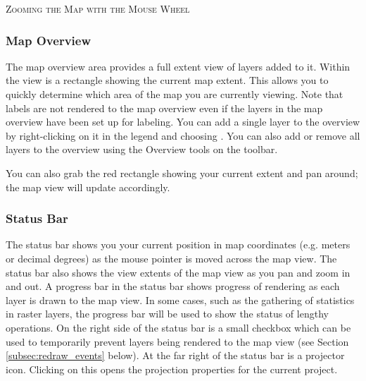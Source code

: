 \begin{Tip}\caption{\textsc{Zooming the Map with the Mouse
Wheel}}
\end{Tip}

\subsubsection{Map Overview}\label{label_mapoverview}

The map overview area provides a full extent view of layers added to it.
Within the view is a rectangle showing the current map extent. This allows
you to quickly determine which area of the map you are currently viewing. Note
that labels are not rendered to the map overview even if the layers in the
map overview have been set up for labeling. 
You can add a single layer to the
overview by right-clicking on it in the legend and choosing . You can also add or remove all layers to the overview using the
Overview tools on the toolbar.

You can also grab the red rectangle showing your current extent and pan around; the
map view will update accordingly.

\subsubsection{Status Bar}\label{label_statusbar}

The status bar shows you your current position in map coordinates (e.g.
meters or decimal degrees) as the mouse pointer is moved across the map view.
The status bar also shows the view extents of the map view as you pan and
zoom in and out. A progress bar in the status bar shows progress of rendering
as each layer is drawn to the map view. In some cases, such as the gathering
of statistics in raster layers, the progress bar will be used to show the
status of lengthy operations. On the right side of the status bar is a small
checkbox which can be used to temporarily prevent layers being rendered to the
map view (see Section \ref{subsec:redraw_events} below). At the far right of
the status bar is a projector icon. Clicking on this opens the projection
properties for the current project.


